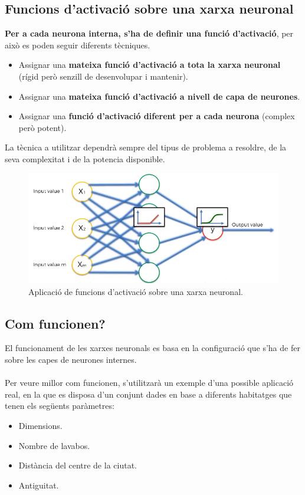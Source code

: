 \documentclass[12pt]{article}
\begin{document}
\subsection{Funcions d'activació sobre una xarxa neuronal}
\textbf{Per a cada neurona interna, s'ha de definir una funció d'activació}, per això es poden seguir diferents tècniques.
\begin{itemize}
	\item Assignar una \textbf{mateixa funció d'activació a tota la xarxa neuronal} (rígid però senzill de desenvolupar i mantenir).
	\item Assignar una \textbf{mateixa funció d'activació a nivell de capa de neurones}.
	\item Assignar una \textbf{funció d'activació diferent per a cada neurona} (complex però potent).
\end{itemize}
La tècnica a utilitzar dependrà sempre del tipus de problema a resoldre, de la seva complexitat i de la potencia disponible.
\begin{figure}[h!]
	\centering
	\includegraphics[scale=0.3]{imatges/fa/5complet.png}
	\caption{Aplicació de funcions d'activació sobre una xarxa neuronal.}
\end{figure}



\clearpage
\subsection{Com funcionen?}
El funcionament de les xarxes neuronals es basa en la configuració que s'ha de fer sobre les capes de neurones internes. 
\\\\Per veure millor com funcionen, s'utilitzarà un exemple d'una possible aplicació real, en la que es disposa d'un conjunt dades en base a diferents habitatges que tenen els següents paràmetres:
\begin{itemize}
	\item Dimensions.
	\item Nombre de lavabos.
	\item Distància del centre de la ciutat.
	\item Antiguitat.
\end{itemize}
\end{document}
